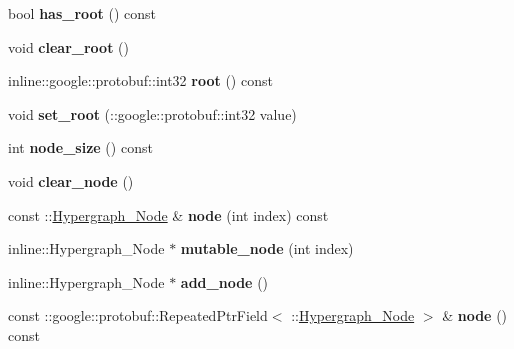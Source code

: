 \begin{DoxyCompactItemize}
\item 
\hypertarget{classHypergraph_ab92016742525abd273fb96859b586bed}{
bool {\bfseries has\_\-root} () const }
\label{classHypergraph_ab92016742525abd273fb96859b586bed}

\item 
\hypertarget{classHypergraph_a2404b1cf118c4511b17748d23a51f9c3}{
void {\bfseries clear\_\-root} ()}
\label{classHypergraph_a2404b1cf118c4511b17748d23a51f9c3}

\item 
\hypertarget{classHypergraph_ac8ba37cfa01a25ccd5f67b82122c359d}{
inline::google::protobuf::int32 {\bfseries root} () const }
\label{classHypergraph_ac8ba37cfa01a25ccd5f67b82122c359d}

\item 
\hypertarget{classHypergraph_aa3a2d6876af145d4ccf600dbcfb2446d}{
void {\bfseries set\_\-root} (::google::protobuf::int32 value)}
\label{classHypergraph_aa3a2d6876af145d4ccf600dbcfb2446d}

\item 
\hypertarget{classHypergraph_ac07666e8012c320a265bb25842fa7238}{
int {\bfseries node\_\-size} () const }
\label{classHypergraph_ac07666e8012c320a265bb25842fa7238}

\item 
\hypertarget{classHypergraph_a85cd3d3e06c7cb448d1a1059f09f1b5d}{
void {\bfseries clear\_\-node} ()}
\label{classHypergraph_a85cd3d3e06c7cb448d1a1059f09f1b5d}

\item 
\hypertarget{classHypergraph_ad2bd2578cecd21f60bf6592318a2770f}{
const ::\hyperlink{classHypergraph__Node}{Hypergraph\_\-Node} \& {\bfseries node} (int index) const }
\label{classHypergraph_ad2bd2578cecd21f60bf6592318a2770f}

\item 
\hypertarget{classHypergraph_ae434b3b5045260dd0c085fd7bbf17469}{
inline::Hypergraph\_\-Node $\ast$ {\bfseries mutable\_\-node} (int index)}
\label{classHypergraph_ae434b3b5045260dd0c085fd7bbf17469}

\item 
\hypertarget{classHypergraph_a919f27df68d64f067227cbeacc863a52}{
inline::Hypergraph\_\-Node $\ast$ {\bfseries add\_\-node} ()}
\label{classHypergraph_a919f27df68d64f067227cbeacc863a52}

\item 
\hypertarget{classHypergraph_aec184e2ac51df4d3fe07b75eb401a7fa}{
const ::google::protobuf::RepeatedPtrField$<$ ::\hyperlink{classHypergraph__Node}{Hypergraph\_\-Node} $>$ \& {\bfseries node} () const }
\label{classHypergraph_aec184e2ac51df4d3fe07b75eb401a7fa}


\end{DoxyCompactItemize}
